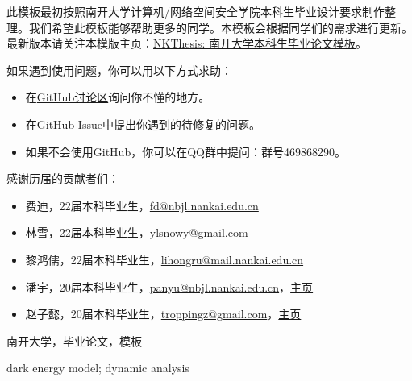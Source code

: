 

\begin{zhaiyao}
\begin{spacing}{1.5}
{

此模板最初按照南开大学计算机/网络空间安全学院本科生毕业设计要求制作整理。我们希望此模板能够帮助更多的同学。本模板会根据同学们的需求进行更新。最新版本请关注本模版主页：\href{https://tr0py.github.io/NKU-thesis-template-2020/}{NKThesis: 南开大学本科生毕业论文模板}。

如果遇到使用问题，你可以用以下方式求助：
\begin{itemize}
	\item 在\href{https://github.com/Tr0py/NKU-thesis-template-2020/discussions}{GitHub讨论区}询问你不懂的地方。
	\item 在\href{https://github.com/Tr0py/NKU-thesis-template-2020/issues}{GitHub Issue}中提出你遇到的待修复的问题。
	\item 如果不会使用GitHub，你可以在QQ群中提问：群号469868290。
\end{itemize}

	
感谢历届的贡献者们：
\begin{itemize}
    \item 费迪，22届本科毕业生，\url{fd@nbjl.nankai.edu.cn}
    \item 林雪，22届本科毕业生，\url{ylsnowy@gmail.com}
    \item 黎鸿儒，22届本科毕业生，\url{lihongru@mail.nankai.edu.cn}
    \item 潘宇，20届本科毕业生，\url{panyu@nbjl.nankai.edu.cn}，\href{https://nbjl.nankai.edu.cn/2019/0513/c19244a264683/page.htm}{主页}
    \item 赵子懿，20届本科毕业生，\url{troppingz@gmail.com}，\href{https://tr0py.github.io/}{主页}
\end{itemize}
}

\end{spacing}
\end{zhaiyao}




\begin{guanjianci}
南开大学，毕业论文，模板
\end{guanjianci}



\begin{abstract}
\begin{spacing}{1.5}
Since 1998, two independent supernova research groups have discovered that the universe is accelerating, and the dark energy has become a hot topic in cosmology. 

\end{spacing}
\end{abstract}


\begin{keywords}
dark energy model; dynamic analysis
\end{keywords} 
